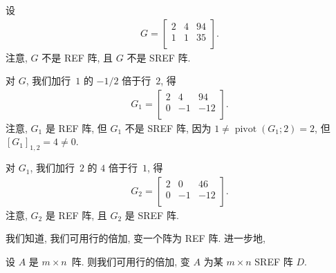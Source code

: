 \documentclass[../libro.tex]{subfiles}
\begin{document}
\begin{example}
    设
    \begin{align*}
        G =
        \begin{bmatrix}
            2 & 4 & 94 \\
            1 & 1 & 35 \\
        \end{bmatrix}.
    \end{align*}
    注意, \(G\) 不是 REF 阵, 且 \(G\) 不是 SREF 阵.

    对 \(G\),
    我们加行~\(1\) 的 \(-1/2\) 倍于行~\(2\),
    得
    \begin{align*}
        G_1 =
        \begin{bmatrix}
            2 & 4  & 94  \\
            0 & -1 & -12 \\
        \end{bmatrix}.
    \end{align*}
    注意, \(G_1\) 是 REF 阵, 但 \(G_1\) 不是 SREF 阵,
    因为 \(1 \neq \operatorname{pivot} {(G_1; 2)} = 2\),
    但 \([G_1]_{1,2} = 4 \neq 0\).

    对 \(G_1\),
    我们加行~\(2\) 的 \(4\) 倍于行~\(1\),
    得
    \begin{align*}
        G_2 =
        \begin{bmatrix}
            2 & 0  & 46  \\
            0 & -1 & -12 \\
        \end{bmatrix}.
    \end{align*}
    注意, \(G_2\) 是 REF 阵, 且 \(G_2\) 是 SREF 阵.
\end{example}

我们知道, 我们可用行的倍加,
变一个阵为 REF 阵.
进一步地,

\begin{theorem}
    设 \(A\) 是 \(m \times n\)~阵.
    则我们可用行的倍加,
    变 \(A\) 为某 \(m \times n\) SREF 阵 \(D\).
\end{theorem}
\end{document}
